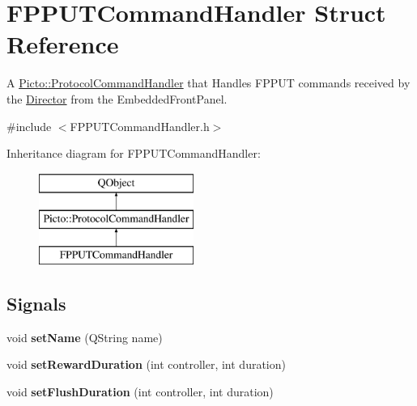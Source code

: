 \hypertarget{struct_f_p_p_u_t_command_handler}{\section{F\-P\-P\-U\-T\-Command\-Handler Struct Reference}
\label{struct_f_p_p_u_t_command_handler}
}


A \hyperlink{struct_picto_1_1_protocol_command_handler}{Picto\-::\-Protocol\-Command\-Handler} that Handles F\-P\-P\-U\-T commands received by the \hyperlink{class_director}{Director} from the Embedded\-Front\-Panel.  




{\ttfamily \#include $<$F\-P\-P\-U\-T\-Command\-Handler.\-h$>$}

Inheritance diagram for F\-P\-P\-U\-T\-Command\-Handler\-:\begin{figure}[H]
\begin{center}
\leavevmode
\includegraphics[height=3.000000cm]{struct_f_p_p_u_t_command_handler}
\end{center}
\end{figure}
\subsection*{Signals}
\begin{DoxyCompactItemize}
\item 
\hypertarget{struct_f_p_p_u_t_command_handler_a7f5663a32079dc0b6adf00d3b307db2e}{void {\bfseries set\-Name} (Q\-String name)}\label{struct_f_p_p_u_t_command_handler_a7f5663a32079dc0b6adf00d3b307db2e}

\item 
\hypertarget{struct_f_p_p_u_t_command_handler_a0ff0b00833a53de8822cf142a66af461}{void {\bfseries set\-Reward\-Duration} (int controller, int duration)}\label{struct_f_p_p_u_t_command_handler_a0ff0b00833a53de8822cf142a66af461}

\item 
\hypertarget{struct_f_p_p_u_t_command_handler_a232a584e09b105eb9090f9ef60e15b91}{void {\bfseries set\-Flush\-Duration} (int controller, int duration)}\label{struct_f_p_p_u_t_command_handler_a232a584e09b105eb9090f9ef60e15b91}

\end{DoxyCompactItemize}
